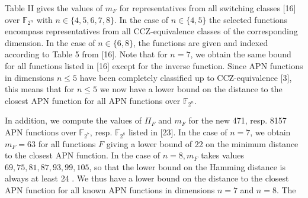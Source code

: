 \documentclass[10pt]{article}
\begin{document}
Table II gives the values of $m_{F}$ for representatives from all switching classes [16] over $\mathbb{F}_{2^{n}}$ with $n \in\{4,5,6,7,8\}$. In the case of $n \in\{4,5\}$ the selected functions encompass representatives from all CCZ-equivalence classes of the corresponding dimension. In the case of $n \in\{6,8\}$, the functions are given and indexed according to Table 5 from [16]. Note that for $n=7$, we obtain the same bound for all functions listed in [16] except for the inverse function. Since APN functions in dimensions $n \leq 5$ have been completely classified up to CCZ-equivalence [3], this means that for $n \leq 5$ we now have a lower bound on the distance to the closest APN function for all APN functions over $\mathbb{F}_{2^{n}}$.

In addition, we compute the values of $\Pi_{F}$ and $m_{F}$ for the new 471, resp. 8157 APN functions over $\mathbb{F}_{2^{7}}$, resp. $\mathbb{F}_{2^{8}}$ listed in [23]. In the case of $n=7$, we obtain $m_{F}=63$ for all functions $F$ giving a lower bound of 22 on the minimum distance to the closest APN function. In the case of $n=8, m_{F}$ takes values $69,75,81,87,93,99,105$, so that the lower bound on the Hamming distance is always at least 24 . We thus have a lower bound on the distance to the closest APN function for all known APN functions in dimensions $n=7$ and $n=8$. The
\end{document}
